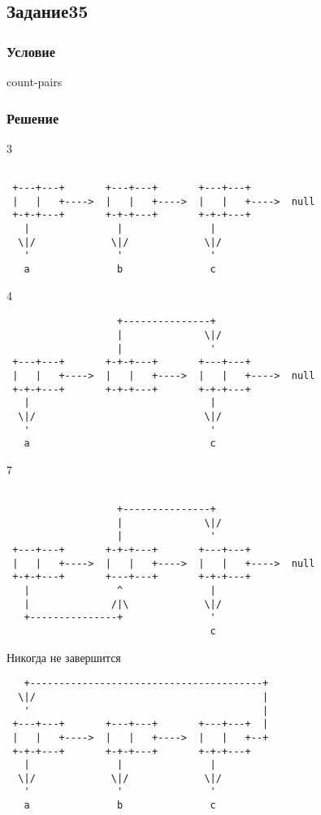 \documentclass[10pt,a4paper]{article}
\begin{document}
\subsection*{Задание35}
\subsubsection*{Условие}
count-pairs
\subsubsection*{Решение}
3
\begin{lstlisting}

 +---+---+       +---+---+       +---+---+
 |   |   +---->  |   |   +---->  |   |   +---->  null
 +-+-+---+       +-+-+---+       +-+-+---+
   |               |               |
  \|/             \|/             \|/
   '               '               '
   a               b               c

\end{lstlisting}
4
\begin{lstlisting}
                   +---------------+
                   |              \|/
                   |               '
 +---+---+       +-+-+---+       +---+---+
 |   |   +---->  |   |   +---->  |   |   +---->  null
 +-+-+---+       +-+-+---+       +-+-+---+
   |                               |
  \|/                             \|/
   '                               '
   a                               c

\end{lstlisting}
7
\begin{lstlisting}

                   +---------------+
                   |              \|/
                   |               '
 +---+---+       +-+-+---+       +---+---+
 |   |   +---->  |   |   +---->  |   |   +---->  null
 +-+-+---+       +---+---+       +-+-+---+
   |               ^               |
   |              /|\             \|/
   +---------------+               '
                                   c

\end{lstlisting}
Никогда не завершится
\begin{lstlisting}
   +----------------------------------------+
  \|/                                       |
   '                                        |
 +---+---+       +---+---+       +---+---+  |
 |   |   +---->  |   |   +---->  |   |   +--+
 +-+-+---+       +-+-+---+       +-+-+---+
   |               |               |
  \|/             \|/             \|/
   '               '               '
   a               b               c

\end{lstlisting}
\end{document}

